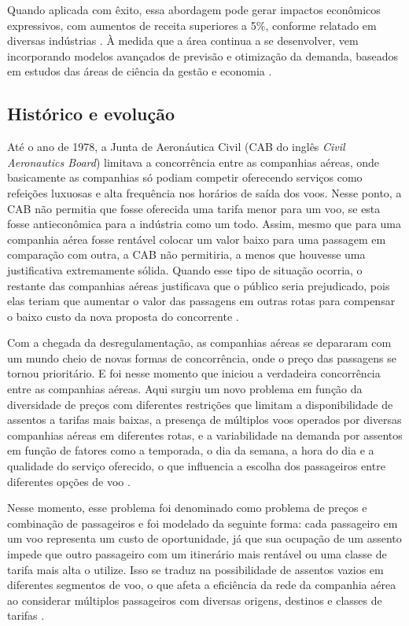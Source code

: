 Quando aplicada com êxito, essa abordagem pode gerar impactos econômicos expressivos, com aumentos de receita superiores a 5\%, conforme relatado em diversas indústrias \citep{Cross1995ANIT}. À medida que a área continua a se desenvolver, vem incorporando modelos avançados de previsão e otimização da demanda, baseados em estudos das áreas de ciência da gestão e economia \citep{Cheraghi2010RevenueMI}.

\subsection{Histórico e evolução}
Até o ano de 1978, a Junta de Aeronáutica Civil (CAB do inglês \textit{Civil Aeronautics Board}) limitava a concorrência entre as companhias aéreas, onde basicamente as companhias só podiam competir oferecendo serviços como refeições luxuosas e alta frequência nos horários de saída dos voos. Nesse ponto, a CAB não permitia que fosse oferecida uma tarifa menor para um voo, se esta fosse antieconômica para a indústria como um todo. Assim, mesmo que para uma companhia aérea fosse rentável colocar um valor baixo para uma passagem em comparação com outra, a CAB não permitiria, a menos que houvesse uma justificativa extremamente sólida. Quando esse tipo de situação ocorria, o restante das companhias aéreas justificava que o público seria prejudicado, pois elas teriam que aumentar o valor das passagens em outras rotas para compensar o baixo custo da nova proposta do concorrente \citep{article_base}.

Com a chegada da desregulamentação, as companhias aéreas se depararam com um mundo cheio de novas formas de concorrência, onde o preço das passagens se tornou prioritário. E foi nesse momento que iniciou a verdadeira concorrência entre as companhias aéreas. Aqui surgiu um novo problema em função da diversidade de preços com diferentes restrições que limitam a disponibilidade de assentos a tarifas mais baixas, a presença de múltiplos voos operados por diversas companhias aéreas em diferentes rotas, e a variabilidade na demanda por assentos em função de fatores como a temporada, o dia da semana, a hora do dia e a qualidade do serviço oferecido, o que influencia a escolha dos passageiros entre diferentes opções de voo \citep{article_base}.

Nesse momento, esse problema foi denominado como problema de preços e combinação de passageiros e foi modelado da seguinte forma: cada passageiro em um voo representa um custo de oportunidade, já que sua ocupação de um assento impede que outro passageiro com um itinerário mais rentável ou uma classe de tarifa mais alta o utilize. Isso se traduz na possibilidade de assentos vazios em diferentes segmentos de voo, o que afeta a eficiência da rede da companhia aérea ao considerar múltiplos passageiros com diversas origens, destinos e classes de tarifas \citep{article_base}.

